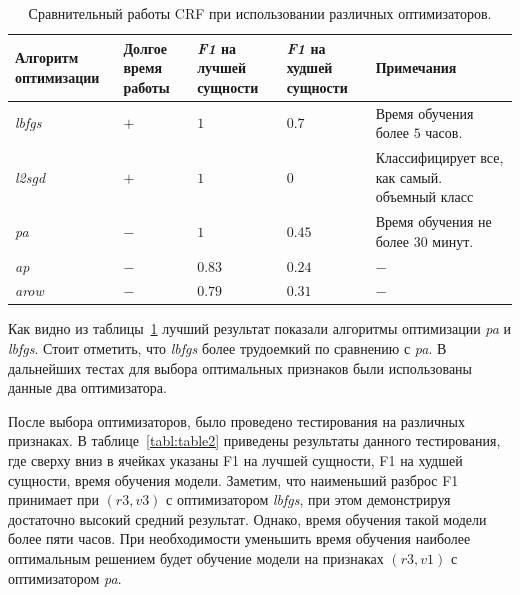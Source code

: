 \documentclass{csmathnotes}
\begin{document}
\begin{table}[!h]
    \begin{center}
        \begin{tabular}{|p{2cm}|p{1.6cm}|p{1.5cm}|p{1.5cm}|p{2.5cm}|}
            \hline
            Алгоритм оптимизации &  Долгое время работы & \emph{F1} на лучшей сущности & \emph{F1} на худшей сущности & Примечания \\
            \hline
            \emph{lbfgs} & $+$ & $1$ & $0.7$ & Время обучения более $5$ часов.  \\
            \hline
            \emph{l2sgd} & $+$ & $1$  & $0$ & Классифицирует все, как самый. объемный класс \\
            \hline
            \emph{pa} & $-$ & $1$  & $0.45$ & Время обучения не более $30$ минут. \\
            \hline
            \emph{ap} & $-$ & $0.83$ & $0.24$  & $-$ \\
            \hline
            \emph{arow} & $-$ & $0.79$ & $0.31$  & $-$ \\
            \hline
        \end{tabular}
    \end{center}
    \caption{\label{tabl:table1}Сравнительный работы CRF при использовании различных оптимизаторов.}
\end{table}

Как видно из таблицы~\ref{tabl:table1} лучший результат показали алгоритмы оптимизации \emph{pa} и \emph{lbfgs}. Стоит отметить, что \emph{lbfgs}  более трудоемкий по сравнению с \emph{pa}. В дальнейших тестах для выбора оптимальных признаков были использованы данные два оптимизатора.


После выбора оптимизаторов, было проведено тестирования на различных признаках. В таблице~\ref{tabl:table2} приведены результаты данного тестирования, где сверху вниз в ячейках указаны F1 на лучшей сущности, F1 на худшей сущности, время обучения модели. Заметим, что наименьший разброс F1  принимает при $(r3,v3)$ с оптимизатором \emph{lbfgs}, при этом демонстрируя достаточно высокий средний результат. Однако, время обучения такой модели более пяти часов. При необходимости уменьшить время обучения наиболее оптимальным решением будет обучение модели на признаках $(r3,v1)$ с оптимизатором \emph{pa}.
\end{document}
